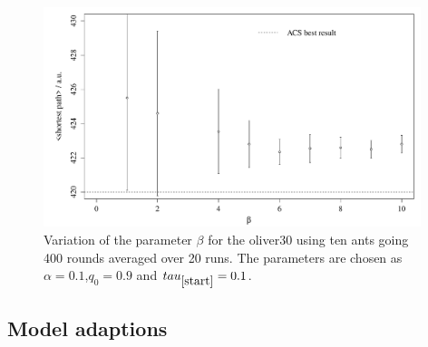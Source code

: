 \begin{figure}[h!]
\begin{center}
\includegraphics[width=11cm, height= 6 cm]{beta_vs_shortestpath}
\caption{Variation of the parameter $\beta$ for the oliver30 using ten ants going 400 rounds averaged over 20 runs. The parameters are chosen as $\alpha=0.1$,$q_0=0.9$ and $tau_{\ref{start}}=0.1$.}
\label{fig:betasp}
\end{center}
\end{figure}



\subsection{Model adaptions}

